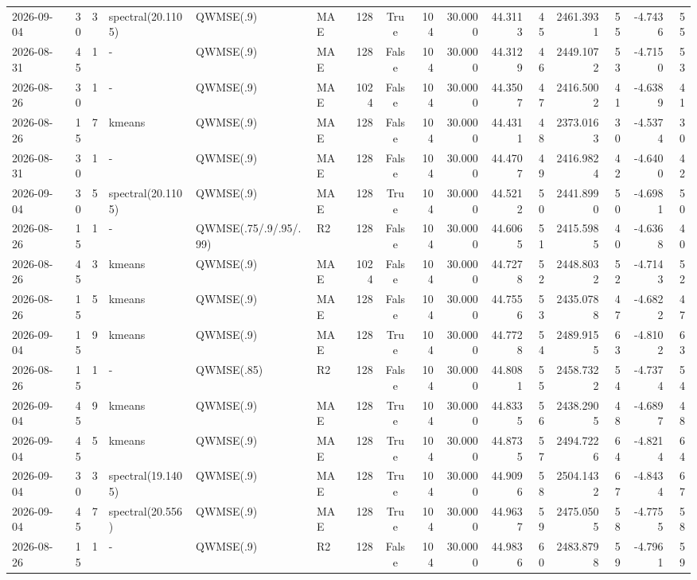 \documentclass[10pt]{article}
\begin{document}
\begin{landscape}
\begin{longtable}{@{}lrrlllrcrrrrrrrr@{}}
2026-09-04 & 30 & 3 & spectral(20.1105) & QWMSE(.9) & MAE & 128 & True & 104 & 30.0000 & 44.3113 & 45 & 2461.3931 & 55 & -4.7436 & 55 \\
2026-08-31 & 45 & 1 & - & QWMSE(.9) & MAE & 128 & False & 104 & 30.0000 & 44.3129 & 46 & 2449.1072 & 53 & -4.7150 & 53 \\
2026-08-26 & 30 & 1 & - & QWMSE(.9) & MAE & 1024 & False & 104 & 30.0000 & 44.3507 & 47 & 2416.5002 & 41 & -4.6389 & 41 \\
2026-08-26 & 15 & 7 & kmeans & QWMSE(.9) & MAE & 128 & False & 104 & 30.0000 & 44.4311 & 48 & 2373.0163 & 30 & -4.5374 & 30 \\
2026-08-31 & 30 & 1 & - & QWMSE(.9) & MAE & 128 & False & 104 & 30.0000 & 44.4707 & 49 & 2416.9824 & 42 & -4.6400 & 42 \\
2026-09-04 & 30 & 5 & spectral(20.1105) & QWMSE(.9) & MAE & 128 & True & 104 & 30.0000 & 44.5212 & 50 & 2441.8990 & 50 & -4.6981 & 50 \\
2026-08-26 & 15 & 1 & - & QWMSE(.75/.9/.95/.99) & R2 & 128 & False & 104 & 30.0000 & 44.6065 & 51 & 2415.5985 & 40 & -4.6368 & 40 \\
2026-08-26 & 45 & 3 & kmeans & QWMSE(.9) & MAE & 1024 & False & 104 & 30.0000 & 44.7278 & 52 & 2448.8032 & 52 & -4.7143 & 52 \\
2026-08-26 & 15 & 5 & kmeans & QWMSE(.9) & MAE & 128 & False & 104 & 30.0000 & 44.7556 & 53 & 2435.0788 & 47 & -4.6822 & 47 \\
2026-09-04 & 15 & 9 & kmeans & QWMSE(.9) & MAE & 128 & True & 104 & 30.0000 & 44.7728 & 54 & 2489.9155 & 63 & -4.8102 & 63 \\
2026-08-26 & 15 & 1 & - & QWMSE(.85) & R2 & 128 & False & 104 & 30.0000 & 44.8081 & 55 & 2458.7322 & 54 & -4.7374 & 54 \\
2026-09-04 & 45 & 9 & kmeans & QWMSE(.9) & MAE & 128 & True & 104 & 30.0000 & 44.8335 & 56 & 2438.2905 & 48 & -4.6897 & 48 \\
2026-09-04 & 45 & 5 & kmeans & QWMSE(.9) & MAE & 128 & True & 104 & 30.0000 & 44.8735 & 57 & 2494.7226 & 64 & -4.8214 & 64 \\
2026-09-04 & 30 & 3 & spectral(19.1405) & QWMSE(.9) & MAE & 128 & True & 104 & 30.0000 & 44.9096 & 58 & 2504.1432 & 67 & -4.8434 & 67 \\
2026-09-04 & 45 & 7 & spectral(20.556) & QWMSE(.9) & MAE & 128 & True & 104 & 30.0000 & 44.9637 & 59 & 2475.0505 & 58 & -4.7755 & 58 \\
2026-08-26 & 15 & 1 & - & QWMSE(.9) & R2 & 128 & False & 104 & 30.0000 & 44.9836 & 60 & 2483.8798 & 59 & -4.7961 & 59 \\

\end{longtable}
\end{landscape}
\end{document}
